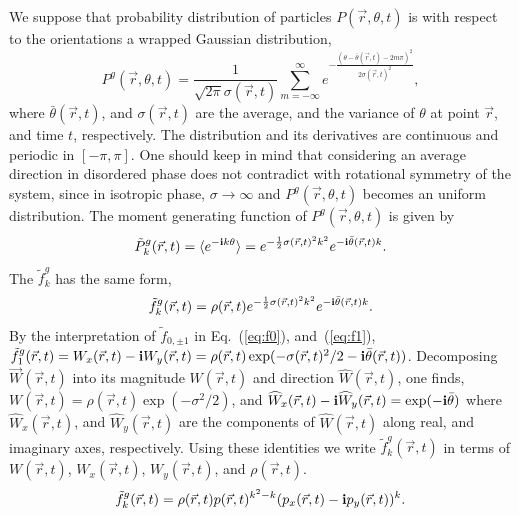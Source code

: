\documentclass[reprint,floatfix,amsmath,amssymb,aps,pre,showkeys,showpacs,superscriptaddress]{revtex4-1}
\newcommand{\ave}[1]{\langle #1 \rangle}
\newcommand{\p}{p}
\newcommand{\im}{{\rm \bf i}}
\newcommand{\w}{W}
\newcommand{\vw}{\vec{\w}}
\newcommand{\reqs}[2]{Eq.~(\ref{#1}), and~(\ref{#2})}
\begin{document}
We suppose that probability distribution of particles $P(\vec{r},\theta,t)$ is with respect to the orientations a wrapped Gaussian distribution,
\begin{equation}
P^{g}(\vec{r},\theta,t) = \frac{1}{\sqrt{2 \pi} \sigma(\vec{r},t)} \sum_{m=-\infty}^{\infty} e^{-\frac{(\theta-\bar{\theta}(\vec{r},t) - 2 m \pi)^2}{2\sigma(\vec{r},t)^2}},
\label{eq:Wrapped-Gaussian}
\end{equation}
where $\bar{\theta}(\vec{r},t)$, and $\sigma(\vec{r},t)$ are the average, and the variance of $\theta$ at point $\vec{r}$, and time $t$, respectively. The distribution and its derivatives are continuous and periodic in $[-\pi,\pi]$. One should keep in mind that considering an average direction in disordered phase does not contradict with rotational symmetry of the system, since in isotropic phase, $\sigma \to \infty$ and $P^g(\vec{r},\theta,t)$ becomes an uniform distribution. The moment generating function of $P^g(\vec{r},\theta,t)$ is given by
\begin{equation}
\tilde{P}^g_k(\vec{r},t) = \ave{e^{-\im k \theta}} = e^{-\frac{1}{2} \sigma(\vec{r},t)^2 k^2 } e^{-\im \bar{\theta}(\vec{r},t) k}.
\label{eq:moment-generator-Pk}
\end{equation}
The $\tilde{f}^g_k$ has the same form,
\begin{equation}
\tilde{f}^g_k(\vec{r},t) = \rho(\vec{r},t) e^{-\frac{1}{2} \sigma(\vec{r},t)^2 k^2 } e^{-\im \bar{\theta}(\vec{r},t) k}.
\end{equation}
By the interpretation of $\tilde{f}_{0,\pm 1}$ in \reqs{eq:f0}{eq:f1}, $\tilde{f}^g_1(\vec{r},t) = \w_x(\vec{r},t) - \im \w_y(\vec{r},t) = \rho(\vec{r},t) \exp(-\sigma(\vec{r},t)^2/2 - \im \bar{\theta}(\vec{r},t))$. Decomposing $\vw(\vec{r},t)$ into its magnitude $\w(\vec{r},t)$ and direction $\widehat{\w}(\vec{r},t)$, one finds, $\w(\vec{r},t) = \rho(\vec{r},t) \exp(-\sigma^2/2)$, and $\widehat{\w}_x(\vec{r},t) - \im \widehat{\w}_y(\vec{r},t) = \exp(-\im \bar{\theta})$ where $\widehat{\w}_x(\vec{r},t)$, and $\widehat{\w}_y(\vec{r},t)$ are the components of $\widehat{\w}(\vec{r},t)$ along real, and imaginary axes, respectively. Using these identities we write $\tilde{f}^g_k(\vec{r},t)$ in terms of $\w(\vec{r},t)$, $\w_x(\vec{r},t)$, $\w_y(\vec{r},t)$, and $\rho(\vec{r},t)$.
\begin{equation}
\tilde{f}^g_k(\vec{r},t) = \rho(\vec{r},t) \p(\vec{r},t)^{k^2 - k} (\p_x(\vec{r},t) - \im \p_y(\vec{r},t))^k.
\label{eq:Gaussian-fk}
\end{equation}
\end{document}
